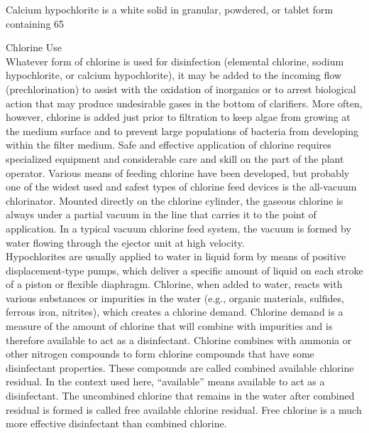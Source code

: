 Calcium hypochlorite is a white solid in granular, powdered, or tablet form containing 65%

Chlorine Use\\
Whatever form of chlorine is used for disinfection (elemental chlorine, sodium hypochlorite, or calcium hypochlorite), it may be added to the incoming flow (prechlorination) to assist with the oxidation of inorganics or to arrest biological action that may produce undesirable gases in the bottom of clarifiers. More often, however, chlorine is added just prior to filtration to keep algae from growing at the medium surface and to prevent large populations of bacteria from developing within the filter medium. Safe and effective application of chlorine requires specialized equipment and considerable care and skill on the part of the plant operator. Various means of feeding chlorine have been developed, but probably one of the widest used and safest types of chlorine feed devices is the all-vacuum chlorinator. Mounted directly on the chlorine cylinder, the gaseous chlorine is always under a partial vacuum in the line that carries it to the point of application. In a typical vacuum chlorine feed system, the vacuum is formed by water flowing through the ejector unit at high velocity.\\
Hypochlorites are usually applied to water in liquid form by means of positive displacement-type pumps, which deliver a specific amount of liquid on each stroke of a piston or flexible diaphragm. Chlorine, when added to water, reacts with various substances or impurities in the water (e.g., organic materials, sulfides, ferrous iron, nitrites), which creates a chlorine demand. Chlorine demand is a measure of the amount of chlorine that will combine with impurities and is therefore available to act as a disinfectant. Chlorine combines with ammonia or other nitrogen compounds to form chlorine compounds that have some disinfectant properties. These compounds are called combined available chlorine residual. In the context used here, “available” means available to act as a disinfectant. The uncombined chlorine that remains in the water after combined residual is formed is called free available chlorine residual. Free chlorine is a much more effective disinfectant than combined chlorine.\\

